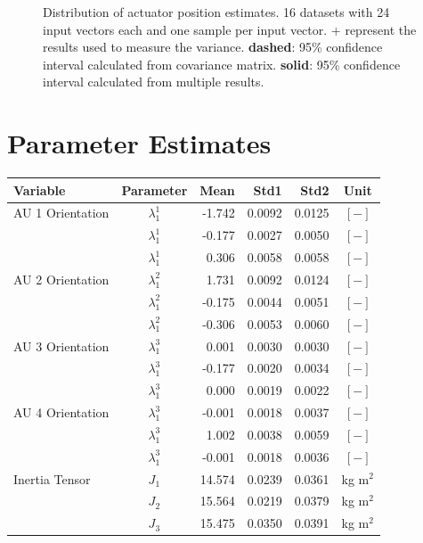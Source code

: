 \begin{figure}[hbtp]
\caption{Distribution of actuator position estimates. 16 datasets with 24 input vectors each and one sample per input vector.
$\mathbf{+}$ represent the results used to measure the variance.
\textbf{dashed}: 95\% confidence interval calculated from covariance matrix.
\textbf{solid}: 95\% confidence interval calculated from multiple results. }
\label{fig:result_95pc_confidence_all}
\end{figure}


\section{Parameter Estimates}
\label{sec:app_parameter_est}

\begin{table}[H]
\begin{tabular}{lcrrrc}
Variable & Parameter & Mean & Std1 & Std2 & Unit \\
\hline \hline
AU 1 Orientation & $\lambda_1^1$ & -1.742 & 0.0092 & 0.0125 & $[-]$ \\
                 & $\lambda_1^1$ & -0.177 & 0.0027 & 0.0050 & $[-]$ \\
                 & $\lambda_1^1$ &  0.306 & 0.0058 & 0.0058 & $[-]$ \\
AU 2 Orientation & $\lambda_1^2$ &  1.731 & 0.0092 & 0.0124 & $[-]$ \\
                 & $\lambda_1^2$ & -0.175 & 0.0044 & 0.0051 & $[-]$ \\
                 & $\lambda_1^2$ & -0.306 & 0.0053 & 0.0060 & $[-]$ \\
AU 3 Orientation & $\lambda_1^3$ &  0.001 & 0.0030 & 0.0030 & $[-]$ \\
                 & $\lambda_1^3$ & -0.177 & 0.0020 & 0.0034 & $[-]$ \\
                 & $\lambda_1^3$ &  0.000 & 0.0019 & 0.0022 & $[-]$ \\
AU 4 Orientation & $\lambda_1^3$ & -0.001 & 0.0018 & 0.0037 & $[-]$ \\
                 & $\lambda_1^3$ &  1.002 & 0.0038 & 0.0059 & $[-]$ \\
                 & $\lambda_1^3$ & -0.001 & 0.0018 & 0.0036 & $[-]$ \\
\hline
Inertia Tensor & $J_1$ & 14.574 & 0.0239 & 0.0361 & kg m$^2$ \\
               & $J_2$ & 15.564 & 0.0219 & 0.0379 & kg m$^2$ \\
               & $J_3$ & 15.475 & 0.0350 & 0.0391 & kg m$^2$ \\

\end{tabular}
\end{table}
